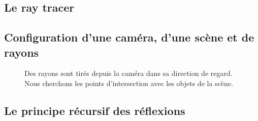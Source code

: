 \documentclass[11pt]{article}
\begin{document}
	\begin{appendices}
		\section{Le ray tracer}
			\subsection{Configuration d'une caméra, d'une scène et de rayons}
			\begin{figure}[h!]

				\caption{Des rayons sont tirés depuis la caméra dans sa direction de regard. Nous cherchons les points d'intersection avec les objets de la scène.}
			\end{figure}
			\FloatBarrier
			\label{annexe:repreCamRayon}

			\subsection{Le principe récursif des réflexions}
			\begin{figure}[h!]


\end{figure}
\end{appendices}
\end{document}
